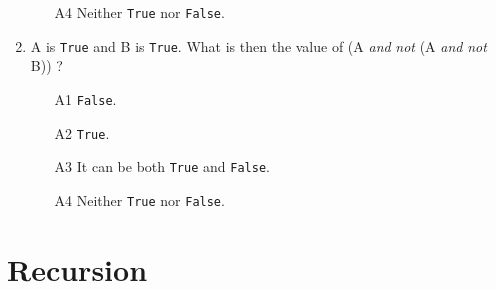 \begin{enumerate}
\begin{enumerate}
\item[A4] Neither {\tt True} nor {\tt False}.
\end{enumerate}
\item A is {\tt True} and B is {\tt True}. What is then the value of (A {\em and} {\em not} (A {\em and} {\em not} B)) ?
\begin{enumerate}
\item[A1] {\tt False}.
\item[A2] {\tt True}.
\item[A3] It can be both {\tt True} and {\tt False}.
\item[A4] Neither {\tt True} nor {\tt False}.
\end{enumerate}
\end{enumerate}


\section{Recursion}

